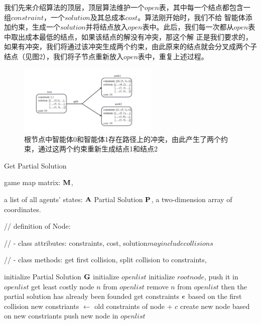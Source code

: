 \documentclass[UTF8]{ctexart}  %
\begin{document}
我们先来介绍算法的顶层，顶层算法维护一个$open$表，其中每一个结点都包含一组$constraint$，一个$solution$及其总成本$cost$。算法刚开始时，我们不给
智能体添加约束，生成一个$solution$并将结点放入$open$表中。此后，我们每一次都从$open$表中取出成本最低的结点，如果该结点的解没有冲突，那这个解
正是我们要求的，如果有冲突，我们将通过该冲突生成两个约束，由此原来的结点就会分叉成两个子结点（见图2），我们将子节点重新放入$open$表中，重复上述过程。

\begin{figure}[H]
    \centering
    \centering
    \includegraphics[width=0.6\textwidth, keepaspectratio]{fig2.png}
    \captionsetup{font=footnotesize}
    \caption{根节点中智能体0和智能体1存在路径上的冲突，由此产生了两个约束，通过这两个约束重新生成结点1和结点2}
    \label{figure1}
\end{figure}







\begin{algorithm}
    \renewcommand{\algorithmicrequire}{\textbf{Input:}}
	\renewcommand{\algorithmicensure}{\textbf{Output:}}
    \caption{Get Partial Solution}
    \label{alg:example}
    \begin{algorithmic}[2]
        \REQUIRE 
            game map matrix: $\bf M$,

            a list of all agents' states: $\bf A$
        \ENSURE
            Partial Solution $\bf P$, a two-dimension array of coordinates.

        // definition of Node: 

        // - class attributes: constraints, cost, solution\( may include collisions \)
        
        // - class methods: get first collision, split collision to constraints, 

        \STATE initialize Partial Solution $\bf G$  
        \STATE initialize $open list$
        \STATE initialize $root node$, push it in $open list$
            \STATE get least costly node $n$ from $open list$
            \STATE remove $n$ from $open list$
                \STATE then the partial solution has already been founded
            \ELSE
                \STATE get constraints $\bf c$ based on the first collision
                    \STATE new constriants $\gets$ old constraints of node + $c$
                    \STATE create new node based on new constriants
                    \STATE push new node in $open list$
                \ENDFOR
            \ENDIF
        \ENDWHILE
    \end{algorithmic}
\end{algorithm}
\end{document}
